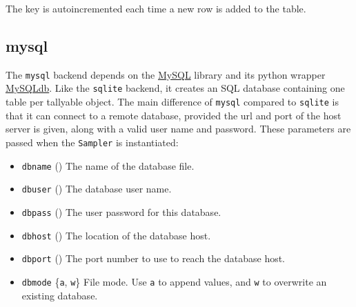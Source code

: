 The key is autoincremented each time a new row is added to the table.
\begin{center}\begin{sffamily}
\end{sffamily}
\end{center}



\hypertarget{mysql}{}
\subsection*{mysql}
\label{mysql}

The \texttt{mysql} backend depends on the \href{http://www.mysql.com/downloads/}{MySQL} library and its python wrapper
\href{http://sourceforge.net/projects/mysql-python}{MySQLdb}. Like the \texttt{sqlite} backend, it creates an SQL database containing
one table per tallyable object. The main difference of \texttt{mysql} compared to
\texttt{sqlite} is that it can connect to a remote database, provided the url and
port of the host server is given, along with a valid user name and password.
These parameters are passed when the \texttt{Sampler} is instantiated:
\begin{itemize}
\item {} 
\texttt{dbname} () The name of the database file.

\item {} 
\texttt{dbuser} () The database user name.

\item {} 
\texttt{dbpass} () The user password for this database.

\item {} 
\texttt{dbhost} () The location of the database host.

\item {} 
\texttt{dbport} ()    The port number to use to reach the database host.

\item {} 
\texttt{dbmode} {\{}\texttt{a}, \texttt{w}{\}} File mode.  Use \texttt{a} to append values, and \texttt{w}
to overwrite an existing database.

\end{itemize}
\begin{center}\begin{sffamily}
\end{sffamily}
\end{center}


